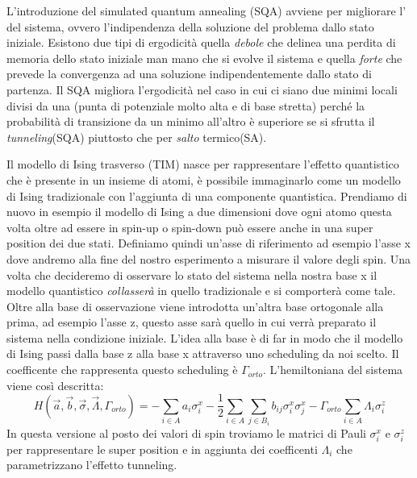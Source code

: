 \cite{QA}L'introduzione del simulated quantum annealing (SQA) avviene per migliorare l' del sistema, ovvero l'indipendenza della soluzione del problema dallo stato iniziale. Esistono due tipi di ergodicità quella \textit{debole} che delinea una perdita di memoria dello stato iniziale man mano che si evolve il sistema e quella \textit{forte} che prevede la convergenza ad una soluzione indipendentemente dallo stato di partenza. Il SQA migliora l'ergodicità nel caso in cui ci siano due minimi locali divisi da una  (punta di potenziale molto alta e di base stretta) perché la probabilità di transizione da un minimo all'altro è superiore se si sfrutta il \textit{tunneling}(SQA) piuttosto che per \textit{salto} termico(SA).

\cite{QA}Il modello di Ising trasverso (TIM) nasce per rappresentare l'effetto quantistico che è presente in un insieme di atomi, è possibile immaginarlo come un modello di Ising tradizionale con l'aggiunta di una componente quantistica. Prendiamo di nuovo in esempio il modello di Ising a due dimensioni dove ogni atomo questa volta oltre ad essere in spin-up o spin-down può essere anche in una super position dei due stati. Definiamo quindi un'asse di riferimento ad esempio l'asse x dove andremo alla fine del nostro esperimento a misurare il valore degli spin. Una volta che decideremo di osservare lo stato del sistema nella nostra base x il modello quantistico \textit{collasserà} in quello tradizionale e si comporterà come tale. Oltre alla base di osservazione viene introdotta un'altra base ortogonale alla prima, ad esempio l'asse z, questo asse sarà quello in cui verrà preparato il sistema nella condizione iniziale. L'idea alla base è di far in modo che il modello di Ising passi dalla base z alla base x attraverso uno scheduling da noi scelto. Il coefficente che rappresenta questo scheduling è $\Gamma_{orto}$. L'hemiltoniana del sistema viene così descritta:
$$ H(\vec{a}, \vec{b}, \vec{\sigma}, \vec{\Lambda}, \Gamma_{orto}) = - \sum_{i \in A } a_i \sigma^x_i - \frac{1}{2} \sum_{i \in A} \sum_{j \in B_i} b_{ij} \sigma^x_i \sigma^x_j - \Gamma_{orto} \sum_{i \in A } \Lambda_i \sigma^z_i$$
In questa versione al posto dei valori di spin troviamo le matrici di Pauli $\sigma^x_i$ e $\sigma^z_i$ per rappresentare le super position e in aggiunta dei coefficenti $\Lambda_i$ che parametrizzano l'effetto tunneling.

